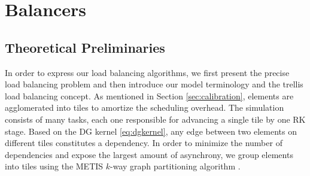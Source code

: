 \section{Balancers}
\label{sec:balancers}
\subsection{Theoretical Preliminaries}
In order to express our load balancing algorithms, we first present the precise load balancing problem and then introduce our model terminology and the trellis load balancing concept.
As mentioned in Section \ref{sec:calibration}, elements are agglomerated into tiles to amortize the scheduling overhead.  The simulation consists of many tasks, each one responsible for advancing a single tile by one RK stage.  Based on the DG kernel \eqref{eq:dgkernel}, any edge between two elements on different tiles constitutes a dependency. In order to minimize the number of dependencies and expose the largest amount of asynchrony, we group elements into tiles using the METIS $k$-way graph partitioning algorithm \cite{Karypis1998}.


